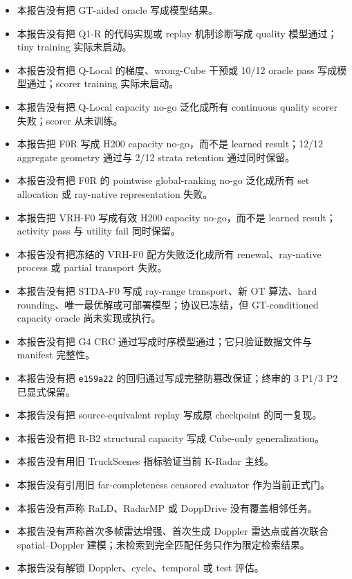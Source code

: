 \documentclass[11pt,a4paper,fontset=none]{ctexart}
\newcommand{\code}[1]{\texttt{#1}}
\begin{document}
\small
\begin{itemize}[itemsep=0.15em,topsep=0.2em]
  \item 本报告没有把 GT-aided oracle 写成模型结果。
  \item 本报告没有把 Q1-R 的代码实现或 replay 机制诊断写成 quality 模型通过；tiny training 实际未启动。
  \item 本报告没有把 Q-Local 的梯度、wrong-Cube 干预或 10/12 oracle pass 写成模型通过；scorer training 实际未启动。
  \item 本报告没有把 Q-Local capacity no-go 泛化成所有 continuous quality scorer 失败；scorer 从未训练。
  \item 本报告把 F0R 写成 H200 capacity no-go，而不是 learned result；12/12 aggregate geometry 通过与 2/12 strata retention 通过同时保留。
  \item 本报告没有把 F0R 的 pointwise global-ranking no-go 泛化成所有 set allocation 或 ray-native representation 失败。
  \item 本报告把 VRH-F0 写成有效 H200 capacity no-go，而不是 learned result；activity pass 与 utility fail 同时保留。
  \item 本报告没有把冻结的 VRH-F0 配方失败泛化成所有 renewal、ray-native process 或 partial transport 失败。
  \item 本报告没有把 STDA-F0 写成 ray-range transport、新 OT 算法、hard rounding、唯一最优解或可部署模型；协议已冻结，但 GT-conditioned capacity oracle 尚未实现或执行。
  \item 本报告没有把 G4 CRC 通过写成时序模型通过；它只验证数据文件与 manifest 完整性。
  \item 本报告没有把 \code{e159a22} 的回归通过写成完整防篡改保证；终审的 3 P1/3 P2 已显式保留。
  \item 本报告没有把 source-equivalent replay 写成原 checkpoint 的同一复现。
  \item 本报告没有把 R-B2 structural capacity 写成 Cube-only generalization。
  \item 本报告没有用旧 TruckScenes 指标验证当前 K-Radar 主线。
  \item 本报告没有引用旧 far-completeness censored evaluator 作为当前正式门。
  \item 本报告没有声称 RaLD、RadarMP 或 DoppDrive 没有覆盖相邻任务。
  \item 本报告没有声称首次多帧雷达增强、首次生成 Doppler 雷达点或首次联合 spatial--Doppler 建模；未检索到完全匹配任务只作为限定检索结果。
  \item 本报告没有解锁 Doppler、cycle、temporal 或 test 评估。
\end{itemize}
\end{document}
